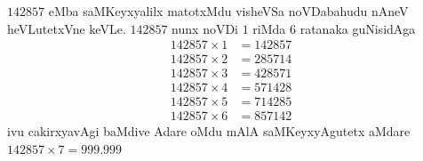 \newpage

$142857$ eMba saMKeyxyalilx matotxMdu visheVSa noVDabahudu nAneV heVLutetxVne keVLe. $142857$ nunx noVDi $1$ riMda $6$ ratanaka guNisidAga 
\begin{align*}
  142857 \times 1 & = 142857\\
  142857 \times 2 & = 285714\\
  142857 \times 3 & = 428571\\
  142857 \times 4 & =571428\\
  142857 \times 5 & =714285\\
  142857 \times 6 & =857142
\end{align*}
ivu cakirxyavAgi baMdive Adare oMdu mAlA saMKeyxyAgutetx aMdare $142857 \times 7 = 999.999$

